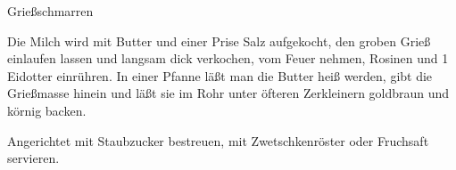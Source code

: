 \begin{recipe}[\vegetarian]{Grießschmarren}
%
%
%
%
%

\begin{ingredients}
\end{ingredients}

\begin{instructions}
    Die Milch wird mit Butter und einer Prise Salz aufgekocht, den groben Grieß einlaufen lassen und langsam dick verkochen, vom Feuer nehmen, Rosinen und 1 Eidotter einrühren.
    In einer Pfanne läßt man die Butter heiß werden, gibt die Grießmasse hinein und läßt sie im Rohr unter öfteren Zerkleinern goldbraun und körnig backen.

    Angerichtet mit Staubzucker bestreuen, mit Zwetschkenröster oder Fruchsaft servieren.
\end{instructions}
\end{recipe}
